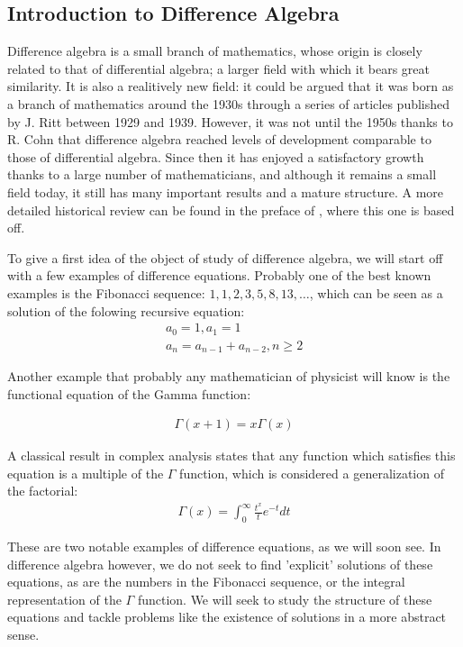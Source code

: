 
\subsection{Introduction to Difference Algebra} 

Difference algebra is a small branch of mathematics, whose origin is closely related to that of differential algebra; a larger field with which it bears great similarity. It is also a realitively new field:
it could be argued that it was born as a branch of mathematics around the 1930s through a series of articles published by J. Ritt between 1929 and 1939. However, it was not until the 1950s thanks to R. Cohn 
that difference algebra reached levels of development comparable to those of differential algebra.  Since then it has enjoyed a satisfactory growth thanks to a large number of mathematicians, and although it remains a small field today,
it still has many important results and a mature structure. A more detailed historical review can be found in the preface of \cite{levin}, where this one is based off.


To give a first idea of the object of study of difference algebra, we will start off with a few examples of difference equations. Probably one of the best known examples is the Fibonacci sequence: $1,1,2,3,5,8,13,\ldots$, which can be seen as a solution of the folowing recursive equation:
\begin{align*}
a_0 = 1,  a_1 = 1 \\ a_n = a_{n-1} + a_{n-2}, n\geq 2
\end{align*}

Another example that probably any mathematician of physicist will know is the functional equation of the Gamma function:

\begin{align*}
\Gamma(x+1) = x \Gamma(x)
\end{align*}

A classical result in complex analysis states that any function which satisfies this equation is a multiple of the $\Gamma$ function,
which is considered a generalization of the factorial:
\begin{align*}
\Gamma(x) = \int_0^\infty{\frac{t^x}{t} e^{-t} dt}
\end{align*}

These are two notable examples of difference equations, as we will soon see. In difference algebra however, we do not seek to find 'explicit' solutions of these equations,
 as are the numbers in the Fibonacci sequence, or the integral representation of the $\Gamma$ function. We will seek to study the structure of these equations and tackle problems like the existence of solutions in a more abstract sense.

